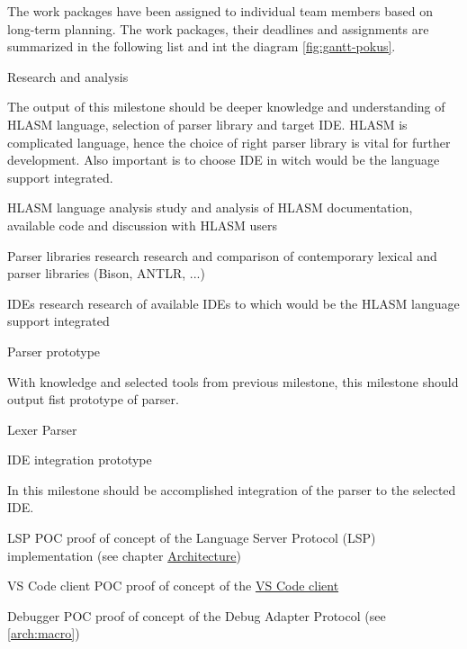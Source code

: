 The work packages have been assigned to individual team members based on long-term planning. The work packages, their deadlines and assignments are summarized in the following list and int the diagram \ref{fig:gantt-pokus}. 



\newpage

\bms
	\itemm Research and analysis 
	
		\small The output of this milestone should be deeper knowledge and understanding of HLASM language, selection of parser library and target IDE.
		HLASM is complicated language, hence the choice of right parser library is vital for further development. Also important is to choose IDE in witch would be the language support integrated.
	
		\bwp
			\itemwp HLASM language analysis 
					\tiny study and analysis of HLASM documentation, available code and discussion with HLASM users
					
			\itemwp Parser libraries research 
					\tiny research and comparison of contemporary lexical and parser libraries (Bison, ANTLR, ...) 
					
			\itemwp IDEs research 
					\tiny research of available IDEs to which would be the HLASM language support integrated
		\eenum
	
	
	\itemm Parser prototype 
	
		\small With knowledge and selected tools from previous milestone, this milestone should output fist prototype of parser.
	
		\bwp
			\itemwp Lexer 
			\itemwp Parser 
		\eenum
	
	
	\itemm IDE integration prototype 
	
		\small In this milestone should be accomplished integration of the parser to the selected IDE.
	
		\bwp
			\itemwp LSP POC 
					\tiny proof of concept of the Language Server Protocol (LSP) implementation (see chapter \hyperref[arch]{Architecture})
					
			\itemwp VS Code client POC 
					\tiny proof of concept of the \hyperref[arch:client]{VS Code client}
					
			\itemwp Debugger POC 
					\tiny proof of concept of the Debug Adapter Protocol (see \ref{arch:macro})
		\eenum
	

